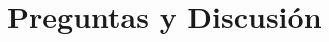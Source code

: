 \documentclass[11pt,aspectratio=169]{beamer}
\begin{document}
%
%


\section{Preguntas y Discusión}
\end{document}
